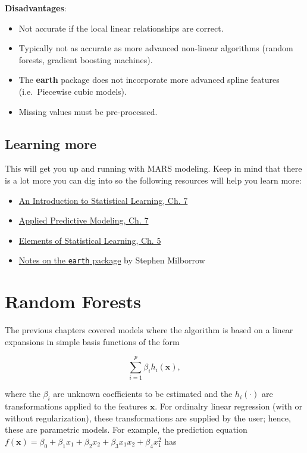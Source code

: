 \documentclass[]{book}
\providecommand{\tightlist}{%
  \setlength{\itemsep}{0pt}\setlength{\parskip}{0pt}}
\theoremstyle{definition}
\theoremstyle{definition}
\theoremstyle{definition}
\theoremstyle{remark}
\begin{document}
\textbf{Disadvantages}:

\begin{itemize}
\tightlist
\item
  Not accurate if the local linear relationships are correct.
\item
  Typically not as accurate as more advanced non-linear algorithms
  (random forests, gradient boosting machines).
\item
  The \textbf{earth} package does not incorporate more advanced spline
  features (i.e.~Piecewise cubic models).
\item
  Missing values must be pre-processed.
\end{itemize}

\hypertarget{learning-more-3}{%
\section{Learning more}\label{learning-more-3}}

This will get you up and running with MARS modeling. Keep in mind that
there is a lot more you can dig into so the following resources will
help you learn more:

\begin{itemize}
\tightlist
\item
  \href{http://www-bcf.usc.edu/~gareth/ISL/}{An Introduction to
  Statistical Learning, Ch. 7}
\item
  \href{http://appliedpredictivemodeling.com/}{Applied Predictive
  Modeling, Ch. 7}
\item
  \href{https://statweb.stanford.edu/~tibs/ElemStatLearn/}{Elements of
  Statistical Learning, Ch. 5}
\item
  \href{http://www.milbo.org/doc/earth-notes.pdf}{Notes on the
  \texttt{earth} package} by Stephen Milborrow
\end{itemize}

\hypertarget{RF}{%
\chapter{Random Forests}\label{RF}}

The previous chapters covered models where the algorithm is based on a
linear expansions in simple basis functions of the form

\[
  \sum_{i=1}^p\beta_ih_i\left(\boldsymbol{x}\right),
  \label{eq:linear-combo}
\]

where the \(\beta_i\) are unknown coefficients to be estimated and the
\(h_i\left(\cdot\right)\) are transformations applied to the features
\(\boldsymbol{x}\). For ordinalry linear regression (with or without
regularization), these transformations are supplied by the user; hence,
these are parametric models. For example, the prediction equation
\(f\left(\boldsymbol{x}\right) = \beta_0 + \beta_1x_1 + \beta_2x_2 + \beta_3x_1x_2 + \beta_4x_1^2\)
has
\end{document}
